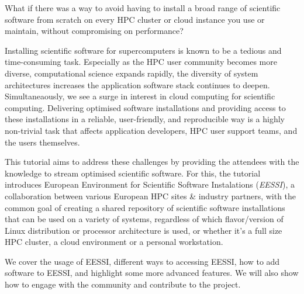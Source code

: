 What if there was a way to avoid having to install a broad range of scientific software from scratch on every HPC
cluster or cloud instance you use or maintain, without compromising on performance?

Installing scientific software for supercomputers is known to be a tedious and time-consuming task. Especially as the
HPC user community becomes more diverse, computational science expands rapidly, the diversity of system architectures
increases the application software stack continues to deepen. Simultaneaously, we see a surge in interest in cloud
computing for scientific computing. Delivering optimised software installations and providing access to these
installations in a reliable, user-friendly, and reproducible way is a highly non-trivial task that affects application
developers, HPC user support teams, and the users themselves.

This tutorial aims to address these challenges by providing the attendees with the knowledge to stream optimised
scientific software. For this, the tutorial introduces European Environment for Scientific Software Instalations
(\emph{EESSI}), a collaboration between various European HPC sites \& industry partners, with the common goal of
creating a shared repository of scientific software installations that can be used on a variety of systems, regardless
of which flavor/version of Linux distribution or processor architecture is used, or whether it’s a full size HPC
cluster, a cloud environment or a personal workstation.

We cover the usage of EESSI, different ways to accessing EESSI, how to add software to EESSI, and highlight some more 
advanced features. We will also show how to engage with the community and contribute to the project.
